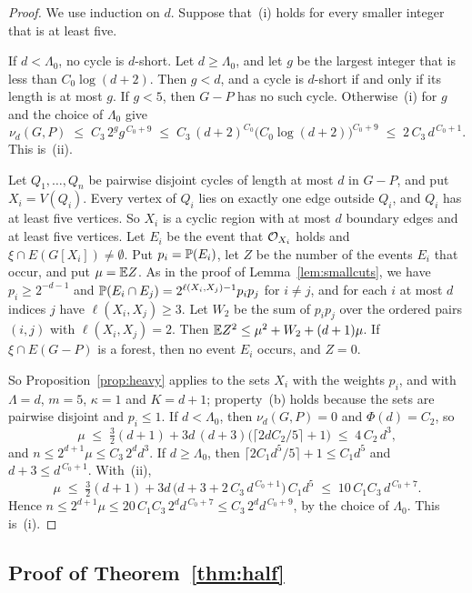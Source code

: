 \begin{proof}
We use induction on $d$. Suppose that~(i) holds for every smaller integer that is at least five.

 If $d<\Lambda_0$, no cycle is $d$-short. Let $d\ge\Lambda_0$, and let
$g$ be the largest integer that is less than $C_0\log(d+2)$. Then $g<d$, and a cycle is $d$-short
if and only if its length is at most $g$. If $g<5$, then $G-P$ has no such cycle. Otherwise~(i)
for $g$ and the choice of $\Lambda_0$ give
\[
  \nu_d(G,P)\;\le\;C_3\,2^{g}g^{\,C_0+9}\;\le\;C_3\,(d+2)^{C_0}\bigl(C_0\log(d+2)\bigr)^{C_0+9}
  \;\le\;2\,C_3\,d^{\,C_0+1}.
\]
This is~(ii).

 Let $Q_1,\dots,Q_n$ be pairwise disjoint cycles of
length at most $d$ in $G-P$, and put $X_i=V(Q_i)$. Every vertex of $Q_i$ lies on exactly one edge
outside $Q_i$, and $Q_i$ has at least five vertices. So $X_i$ is a cyclic region with at most $d$
boundary edges and at least five vertices. Let $E_i$ be the event that $\mathcal{O}_{X_i}$ holds and
$\xi\cap E(G[X_i])\ne\emptyset$. Put $p_i=\mathbb{P}(E_i)$, let $Z$ be the number of the events $E_i$
that occur, and put $\mu=\mathbb{E} Z$. As in the proof of Lemma~\ref{lem:smallcuts}, we have
$p_i\ge2^{-d-1}$ and $\mathbb{P}(E_i\cap E_j)=2^{\ell(X_i,X_j)-1}p_ip_j$ for $i\ne j$, and for each $i$
at most $d$ indices $j$ have $\ell(X_i,X_j)\ge3$. Let $W_2$ be the sum of $p_ip_j$ over the
ordered pairs $(i,j)$ with $\ell(X_i,X_j)=2$. Then $\mathbb{E} Z^{2}\le\mu^{2}+W_2+(d+1)\mu$. If
$\xi\cap E(G-P)$ is a forest, then no event $E_i$ occurs, and $Z=0$.

So Proposition~\ref{prop:heavy} applies to the sets $X_i$ with the weights $p_i$, and with
$\Lambda=d$, $m=5$, $\kappa=1$ and $K=d+1$; property~(b) holds because the sets are pairwise
disjoint and $p_i\le1$. If $d<\Lambda_0$, then $\nu_d(G,P)=0$ and $\Phi(d)=C_2$, so
\[
  \mu\;\le\;\tfrac32(d+1)+3d\,(d+3)\bigl(\lceil2dC_2/5\rceil+1\bigr)\;\le\;4\,C_2\,d^{3},
\]
and $n\le2^{d+1}\mu\le C_3\,2^{d}d^{3}$. If $d\ge\Lambda_0$, then
$\lceil2C_1d^{5}/5\rceil+1\le C_1d^{5}$ and $d+3\le d^{\,C_0+1}$. With~(ii),
\[
  \mu\;\le\;\tfrac32(d+1)+3d\,\bigl(d+3+2\,C_3\,d^{\,C_0+1}\bigr)\,C_1d^{5}
  \;\le\;10\,C_1C_3\,d^{\,C_0+7}.
\]
Hence $n\le2^{d+1}\mu\le20\,C_1C_3\,2^{d}d^{\,C_0+7}\le C_3\,2^{d}d^{\,C_0+9}$, by the choice of
$\Lambda_0$. This is~(i).
\end{proof}

\subsection{Proof of Theorem~\ref{thm:half}}\label{sec:halfproof}

